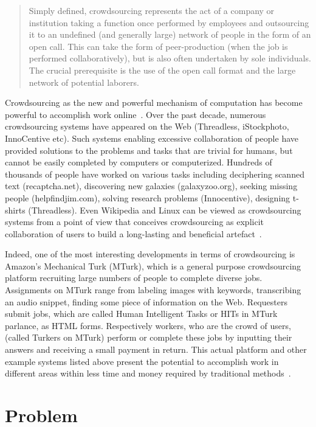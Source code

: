 \begin{quotation}
Simply defined, crowdsourcing represents the act of a company or institution taking 
a function once performed by employees and outsourcing it to an undefined 
(and generally large) network of people in the form of an open call. This can take 
the form of peer-production (when the job is performed collaboratively), but is also 
often undertaken by sole individuals. The crucial prerequisite is the use of the open 
call format and the large network of potential laborers.~\cite{Howe2006a}
\end{quotation}

Crowdsourcing as the new and powerful mechanism of computation has become 
powerful to accomplish work online~\cite{Kittur2011}. Over the past decade, numerous 
crowdsourcing systems have appeared on the Web (Threadless, iStockphoto, 
InnoCentive etc). Such systems enabling excessive collaboration of people have 
provided solutions to the problems and tasks that are trivial for humans, but 
cannot be easily completed by computers or computerized. Hundreds of thousands 
of people have worked on various tasks including deciphering scanned text (recaptcha.net), 
discovering new galaxies (galaxyzoo.org), seeking missing people (helpfindjim.com), 
solving research problems (Innocentive), designing t-shirts (Threadless). Even 
Wikipedia and Linux can be viewed as crowdsourcing systems from a point of view that
conceives crowdsourcing as explicit collaboration of users to 
build a long-lasting and beneficial artefact~\cite{Doan2011}.

Indeed, one of the most interesting developments in terms of crowdsourcing is 
Amazon's Mechanical Turk (MTurk), which is a general purpose crowdsourcing platform 
recruiting large numbers of people to complete diverse jobs. Assignments on MTurk 
range from labeling images with keywords, transcribing an audio snippet, finding some 
piece of information on the Web. Requesters submit jobs, which are called Human 
Intelligent Tasks or HITs in MTurk parlance, as HTML forms. Respectively workers, 
who are the crowd of users, (called Turkers on MTurk) perform or complete these 
jobs by inputting their answers and receiving a small payment in return. This actual 
platform and other example systems listed above present the potential to accomplish 
work in different areas within less time and money required by traditional 
methods~\cite{Minder2012, Marcus2011}.


\section{Problem}
\label{sec:problem}

